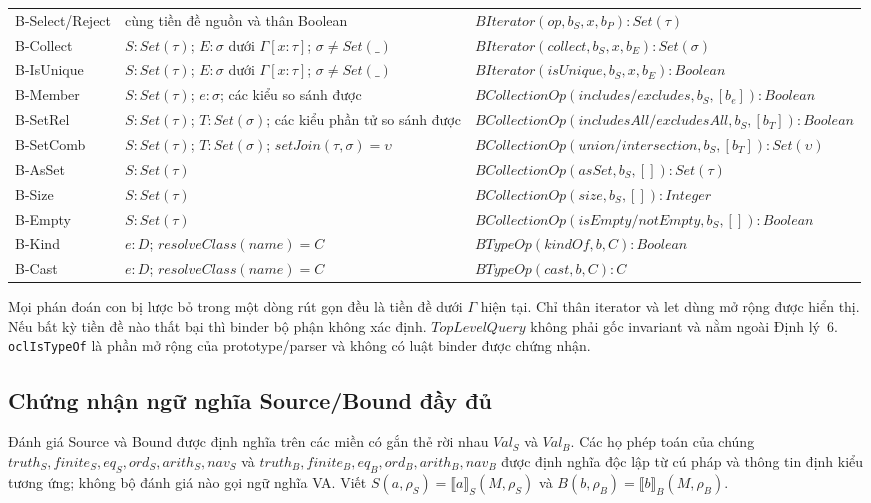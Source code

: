 \documentclass[11pt,a4paper]{article}
\theoremstyle{definition}
\newcommand{\sem}[2]{\llbracket #1 \rrbracket_{#2}}
\begin{document}
\begin{longtable}{p{}p{}p{}}
B-Select/Reject & cùng tiền đề nguồn và thân Boolean &
$BIterator(op,b_S,x,b_P):Set(\tau)$\\
B-Collect & $S:Set(\tau)$; $E:\sigma$ dưới $\Gamma[x:\tau]$; $\sigma\neq Set(\_)$ &
$BIterator(collect,b_S,x,b_E):Set(\sigma)$\\
B-IsUnique & $S:Set(\tau)$; $E:\sigma$ dưới $\Gamma[x:\tau]$; $\sigma\neq Set(\_)$ &
$BIterator(isUnique,b_S,x,b_E):Boolean$\\
B-Member & $S:Set(\tau)$; $e:\sigma$; các kiểu so sánh được &
$BCollectionOp(includes/excludes,b_S,[b_e]):Boolean$\\
B-SetRel & $S:Set(\tau)$; $T:Set(\sigma)$; các kiểu phần tử so sánh được &
$BCollectionOp(includesAll/excludesAll,b_S,[b_T]):Boolean$\\
B-SetComb & $S:Set(\tau)$; $T:Set(\sigma)$; $setJoin(\tau,\sigma)=\upsilon$ &
$BCollectionOp(union/intersection,b_S,[b_T]):Set(\upsilon)$\\
B-AsSet & $S:Set(\tau)$ & $BCollectionOp(asSet,b_S,[]):Set(\tau)$\\
B-Size & $S:Set(\tau)$ & $BCollectionOp(size,b_S,[]):Integer$\\
B-Empty & $S:Set(\tau)$ & $BCollectionOp(isEmpty/notEmpty,b_S,[]):Boolean$\\
B-Kind & $e:D$; $resolveClass(name)=C$ & $BTypeOp(kindOf,b,C):Boolean$\\
B-Cast & $e:D$; $resolveClass(name)=C$ & $BTypeOp(cast,b,C):C$\\
\bottomrule
\end{longtable}
\endgroup

Mọi phán đoán con bị lược bỏ trong một dòng rút gọn đều là tiền đề dưới
$\Gamma$ hiện tại. Chỉ thân iterator và let dùng mở rộng được hiển thị. Nếu bất
kỳ tiền đề nào thất bại thì binder bộ phận không xác định. $TopLevelQuery$
không phải gốc invariant và nằm ngoài Định lý~6. \texttt{oclIsTypeOf} là phần
mở rộng của prototype/parser và không có luật binder được chứng nhận.

\subsection{Chứng nhận ngữ nghĩa Source/Bound đầy đủ}

Đánh giá Source và Bound được định nghĩa trên các miền có gắn thẻ rời nhau
$Val_S$ và $Val_B$. Các họ phép toán của chúng
$truth_S,finite_S,eq_S,ord_S,arith_S,nav_S$ và
$truth_B,finite_B,eq_B,ord_B,arith_B,nav_B$ được định nghĩa độc lập từ cú pháp
và thông tin định kiểu tương ứng; không bộ đánh giá nào gọi ngữ nghĩa VA. Viết
$S(a,\rho_S)=\sem{a}{S}(M,\rho_S)$ và
$B(b,\rho_B)=\sem{b}{B}(M,\rho_B)$.
\end{document}
